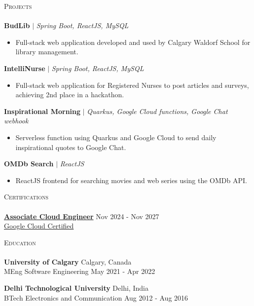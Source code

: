 \documentclass[a4paper]{article}
\newcommand{\lineunder} {
    \vspace*{-8pt} \\
    \hspace*{-18pt} \hrulefill \hspace*{-6pt} \\
}
\newcommand{\header} [1] {
    \vspace*{5pt}
    {\hspace*{-18pt}\vspace*{6pt} \large\textsc{#1}}
    \vspace*{-6pt} \lineunder
}
\newcommand{\resumeHeadingProject}[3]{
    \vspace{1mm}
    {\textbf{#1}} $|$ \emph{#2} %
    \vspace{-2mm}
}
\newcommand{\resumeItemProject}[1]{
  \item{
    \begin{justify}
    \setlength{\rightskip}{0.15in} {#1 \vspace{-4pt}}
    \end{justify}
  }
}
\newcommand{\resumeHeadingEducation}[4]{
    \textbf{#1} \hfill {#2}\\
    {#3} \hfill {#4}\\
    \vspace{2mm}
}
\begin{document}
\header{Projects}

\resumeHeadingProject {BudLib} {Spring Boot, ReactJS, MySQL} {Jan 2022 - Apr 2022}
\begin{itemize}
    \resumeItemProject {Full-stack web application developed and used by Calgary Waldorf School for library management.}
\end{itemize}

\resumeHeadingProject {IntelliNurse} {Spring Boot, ReactJS, MySQL} {Feb 2022 - Mar 2022}
\begin{itemize}
    \resumeItemProject {Full-stack web application for Registered Nurses to post articles and surveys, achieving 2nd place in a hackathon.}
\end{itemize}

\resumeHeadingProject {Inspirational Morning} {Quarkus, Google Cloud functions, Google Chat webhook} {Jun 2024 - Jun 2024}
\begin{itemize}
    \resumeItemProject {Serverless function using Quarkus and Google Cloud to send daily inspirational quotes to Google Chat.}
\end{itemize}

\resumeHeadingProject {OMDb Search} {ReactJS} {Jun 2022 - Jun 2022}
\begin{itemize}
    \resumeItemProject {ReactJS frontend for searching movies and web series using the OMDb API.}
\end{itemize}


\header{Certifications}
\href{https://www.credly.com/badges/52bb681c-f535-47e7-b669-78e9b4d7c4a0}{\textbf{Associate Cloud Engineer}} \hfill Nov 2024 - Nov 2027\\
\href{https://www.credly.com/badges/52bb681c-f535-47e7-b669-78e9b4d7c4a0}{Google Cloud Certified}
\vspace{2mm}


\header{Education}

\resumeHeadingEducation {University of Calgary} {Calgary, Canada} {MEng Software Engineering} {May 2021 - Apr 2022}
\resumeHeadingEducation {Delhi Technological University} {Delhi, India} {BTech Electronics and Communication} {Aug 2012 - Aug 2016}


\
\end{document}
